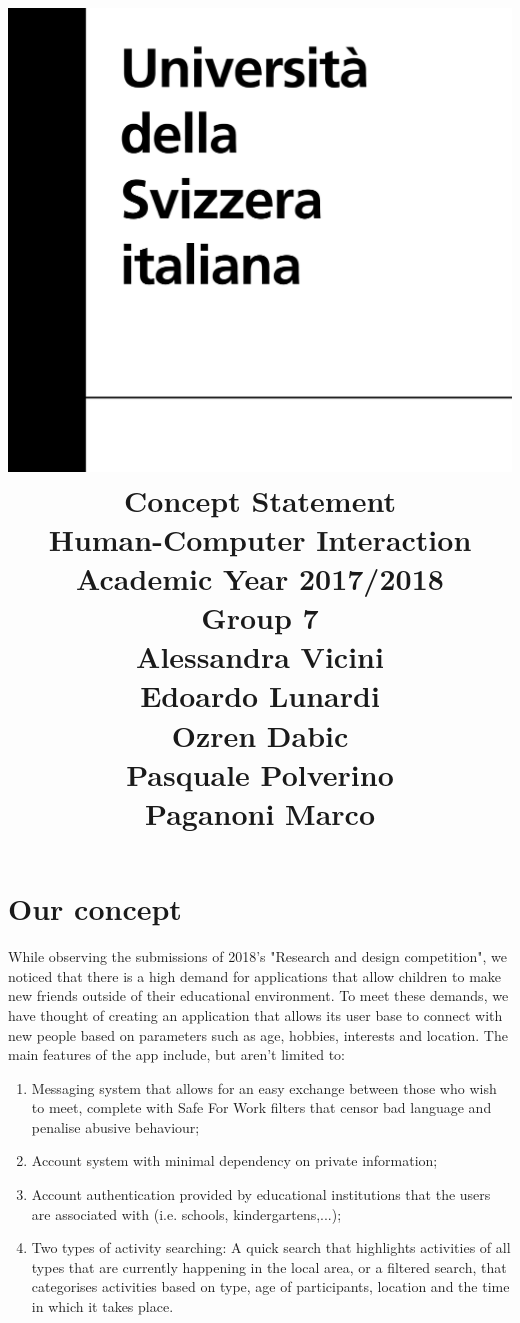 \documentclass[12pt]{article}
\title {
	\includegraphics[width = .2\linewidth]{University-of-Lugano.png} \break \break
	{\bf\Huge Concept Statement}
	\\\large Human-Computer Interaction
	\\\small Academic Year 2017/2018 \break
	\\\large \textbf{Group 7}
	\\\large Alessandra Vicini \\ Edoardo Lunardi \\ Ozren Dabic \\ Pasquale Polverino \\ Paganoni Marco}
\begin{document}
	
	\maketitle
	\newpage
	
	\part*{Our concept}
	While observing the submissions of 2018's "Research and design competition", we noticed that there is a high demand for applications that allow children to make new friends outside of their educational environment. To meet these demands, we have thought of creating an application that allows its user base to connect with new people based on parameters such as age, hobbies, interests and location. The main features of the app include, but aren't limited to:
	\begin{enumerate}
		\item Messaging system that allows for an easy exchange between those who wish to meet, complete with Safe For Work filters that censor bad language and penalise abusive behaviour;
		\item Account system with minimal dependency on private information;
		\item Account authentication provided by educational institutions that the users are associated with (i.e. schools, kindergartens,...);
		\item Two types of activity searching: A quick search that highlights activities of all types that are currently happening in the local area, or a filtered search, that categorises activities based on type, age of participants, location and the time in which it takes place. 
	\end{enumerate}
	
	
\end{document}
